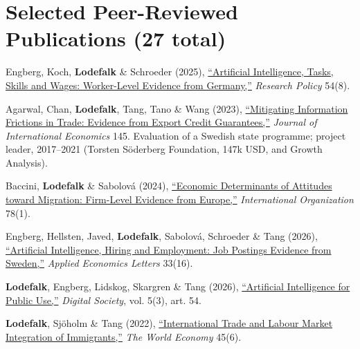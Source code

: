 \documentclass[11pt,a4paper]{article}
\newcommand{\name}[1]{\textbf{#1}}
\newcommand{\publication}[1]{\item #1}
\newcommand{\sectioncount}[1]{\textcolor{countgray}{\normalfont(#1)}}
\begin{document}
\section{Selected Peer-Reviewed Publications \sectioncount{27 total}}
\vspace{-2pt}
\begin{enumerate}[label={[\arabic*]}]

\publication{Engberg, Koch, \name{Lodefalk} \& Schroeder (2025), \href{https://doi.org/10.1016/j.respol.2025.105285}{``Artificial Intelligence, Tasks, Skills and Wages: Worker-Level Evidence from Germany,''} \textit{Research Policy} 54(8).}

\publication{Agarwal, Chan, \name{Lodefalk}, Tang, Tano \& Wang (2023), \href{https://doi.org/10.1016/j.jinteco.2023.103831}{``Mitigating Information Frictions in Trade: Evidence from Export Credit Guarantees,''} \textit{Journal of International Economics} 145. Evaluation of a Swedish state programme; project leader, 2017--2021 (Torsten Söderberg Foundation, 147k USD, and Growth Analysis).} %

\publication{Baccini, \name{Lodefalk} \& Sabolová (2024), \href{https://doi.org/10.1017/s0020818323000255}{``Economic Determinants of Attitudes toward Migration: Firm-Level Evidence from Europe,''} \textit{International Organization} 78(1).}

\publication{Engberg, Hellsten, Javed, \name{Lodefalk}, Sabolová, Schroeder \& Tang (2026), \href{https://doi.org/10.1080/13504851.2025.2497431}{``Artificial Intelligence, Hiring and Employment: Job Postings Evidence from Sweden,''} \textit{Applied Economics Letters} 33(16).}

\publication{\name{Lodefalk}, Engberg, Lidskog, Skargren \& Tang (2026), \href{https://doi.org/10.1007/s44206-026-00285-z}{``Artificial Intelligence for Public Use,''} \textit{Digital Society}, vol. 5(3), art. 54.} %

\publication{\name{Lodefalk}, Sjöholm \& Tang (2022), \href{https://doi.org/10.1111/twec.13240}{``International Trade and Labour Market Integration of Immigrants,''} \textit{The World Economy} 45(6).}

\end{enumerate}

\end{document}
